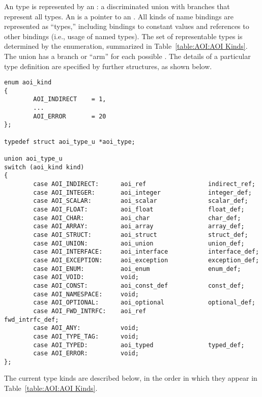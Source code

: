 An \IDL{} type is represented by an : a discriminated union
with branches that represent all \IDL{} types.  An  is a pointer
to an .  All kinds of name bindings are represented as
``types,'' including bindings to constant values and references to other
bindings (i.e., usage of named types).  The set of representable types is
determined by the  enumeration, summarized in
Table~\ref{table:AOI:AOI Kinds}.  The  union has a branch or
``arm'' for each possible .  The details of a particular \AOI{}
type definition are specified by further \AOI{} structures, as shown below.

\begin{verbatim}
enum aoi_kind
{
        AOI_INDIRECT    = 1,
        ...
        AOI_ERROR       = 20
};

typedef struct aoi_type_u *aoi_type;

union aoi_type_u
switch (aoi_kind kind)
{
        case AOI_INDIRECT:      aoi_ref                 indirect_ref;
        case AOI_INTEGER:       aoi_integer             integer_def;
        case AOI_SCALAR:        aoi_scalar              scalar_def;
        case AOI_FLOAT:         aoi_float               float_def;
        case AOI_CHAR:          aoi_char                char_def;
        case AOI_ARRAY:         aoi_array               array_def;
        case AOI_STRUCT:        aoi_struct              struct_def;
        case AOI_UNION:         aoi_union               union_def;
        case AOI_INTERFACE:     aoi_interface           interface_def;
        case AOI_EXCEPTION:     aoi_exception           exception_def;
        case AOI_ENUM:          aoi_enum                enum_def;
        case AOI_VOID:          void;
        case AOI_CONST:         aoi_const_def           const_def;
        case AOI_NAMESPACE:     void;
        case AOI_OPTIONAL:      aoi_optional            optional_def;
        case AOI_FWD_INTRFC:    aoi_ref                 fwd_intrfc_def;
        case AOI_ANY:           void;
        case AOI_TYPE_TAG:      void;
        case AOI_TYPED:         aoi_typed               typed_def;
        case AOI_ERROR:         void;
};
\end{verbatim}

The current \AOI{} type kinds are described below, in the order in which they
appear in Table~\ref{table:AOI:AOI Kinds}.


